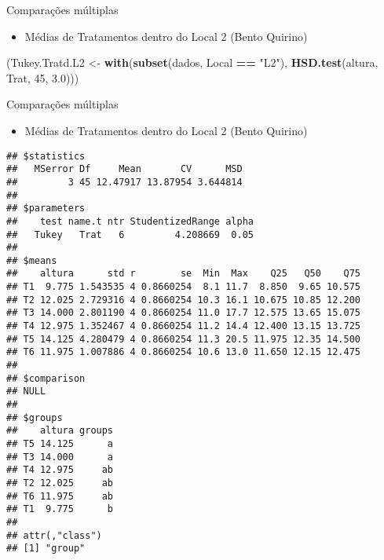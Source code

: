 \documentclass[
  ignorenonframetext,
]{beamer}
\newenvironment{Shaded}{\begin{snugshade}}{\end{snugshade}}
\newcommand{\DecValTok}[1]{\textcolor[rgb]{0.00,0.00,0.81}{#1}}
\newcommand{\FloatTok}[1]{\textcolor[rgb]{0.00,0.00,0.81}{#1}}
\newcommand{\FunctionTok}[1]{\textcolor[rgb]{0.13,0.29,0.53}{\textbf{#1}}}
\newcommand{\NormalTok}[1]{#1}
\newcommand{\OtherTok}[1]{\textcolor[rgb]{0.56,0.35,0.01}{#1}}
\newcommand{\SpecialCharTok}[1]{\textcolor[rgb]{0.81,0.36,0.00}{\textbf{#1}}}
\newcommand{\StringTok}[1]{\textcolor[rgb]{0.31,0.60,0.02}{#1}}
\providecommand{\tightlist}{%
  \setlength{\itemsep}{0pt}\setlength{\parskip}{0pt}}
\begin{document}
\begin{frame}[fragile]{Comparações múltiplas}
\protect\hypertarget{comparauxe7uxf5es-muxfaltiplas-3}{}
\begin{itemize}
\tightlist
\item
  Médias de Tratamentos dentro do Local 2 (Bento Quirino)
\end{itemize}

\begin{Shaded}
\begin{Highlighting}[]
\NormalTok{(Tukey.Tratd.L2 }\OtherTok{\textless{}{-}} \FunctionTok{with}\NormalTok{(}\FunctionTok{subset}\NormalTok{(dados, Local }\SpecialCharTok{==} \StringTok{"L2"}\NormalTok{),}
                        \FunctionTok{HSD.test}\NormalTok{(altura, }
\NormalTok{                                 Trat,}
                                 \DecValTok{45}\NormalTok{,}
                                 \FloatTok{3.0}\NormalTok{)))}
\end{Highlighting}
\end{Shaded}
\end{frame}

\begin{frame}[fragile]{Comparações múltiplas}
\protect\hypertarget{comparauxe7uxf5es-muxfaltiplas-4}{}
\begin{itemize}
\tightlist
\item
  Médias de Tratamentos dentro do Local 2 (Bento Quirino)
\end{itemize}

\begin{verbatim}
## $statistics
##   MSerror Df     Mean       CV      MSD
##         3 45 12.47917 13.87954 3.644814
## 
## $parameters
##    test name.t ntr StudentizedRange alpha
##   Tukey   Trat   6         4.208669  0.05
## 
## $means
##    altura      std r        se  Min  Max    Q25   Q50    Q75
## T1  9.775 1.543535 4 0.8660254  8.1 11.7  8.850  9.65 10.575
## T2 12.025 2.729316 4 0.8660254 10.3 16.1 10.675 10.85 12.200
## T3 14.000 2.801190 4 0.8660254 11.0 17.7 12.575 13.65 15.075
## T4 12.975 1.352467 4 0.8660254 11.2 14.4 12.400 13.15 13.725
## T5 14.125 4.280479 4 0.8660254 11.3 20.5 11.975 12.35 14.500
## T6 11.975 1.007886 4 0.8660254 10.6 13.0 11.650 12.15 12.475
## 
## $comparison
## NULL
## 
## $groups
##    altura groups
## T5 14.125      a
## T3 14.000      a
## T4 12.975     ab
## T2 12.025     ab
## T6 11.975     ab
## T1  9.775      b
## 
## attr(,"class")
## [1] "group"
\end{verbatim}
\end{frame}
\end{document}
